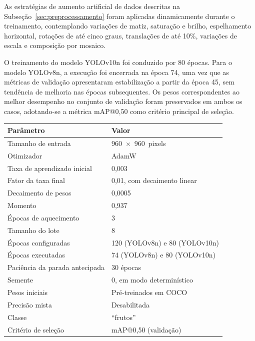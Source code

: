 \documentclass[artigo,times,capa]{iftex2024}
\begin{document}
As estratégias de aumento artificial de dados descritas na
Subseção~\ref{sec:preprocessamento} foram aplicadas dinamicamente
durante o treinamento, contemplando variações de matiz, saturação e
brilho, espelhamento horizontal, rotações de até cinco graus, translações
de até 10\%, variações de escala e composição por mosaico.

O treinamento do modelo YOLOv10n foi conduzido por 80 épocas. Para o
modelo YOLOv8n, a execução foi encerrada na época 74, uma vez que as
métricas de validação apresentaram estabilização a partir da época 45,
sem tendência de melhoria nas épocas subsequentes. Os pesos
correspondentes ao melhor desempenho no conjunto de validação foram
preservados em ambos os casos, adotando-se a métrica mAP@0,50 como
critério principal de seleção.

\begin{board}[htbp]
\centering
\caption{Configuração de treinamento adotada nos experimentos}
\label{quad:config_treinamento}
\begin{tabular}{ll}
\toprule
\textbf{Parâmetro} & \textbf{Valor} \\
\midrule
Tamanho de entrada & 960~$\times$~960~pixels \\
Otimizador & AdamW \\
Taxa de aprendizado inicial & 0,003 \\
Fator da taxa final & 0,01, com decaimento linear \\
Decaimento de pesos & 0,0005 \\
Momento & 0,937 \\
Épocas de aquecimento & 3 \\
Tamanho do lote & 8 \\
Épocas configuradas & 120 (YOLOv8n) e 80 (YOLOv10n) \\
Épocas executadas & 74 (YOLOv8n) e 80 (YOLOv10n) \\
Paciência da parada antecipada & 30 épocas \\
Semente & 0, em modo determinístico \\
Pesos iniciais & Pré-treinados em COCO \\
Precisão mista & Desabilitada \\
Classe & ``frutos'' \\
Critério de seleção & mAP@0,50 (validação) \\
\bottomrule
\end{tabular}
\end{board}
\end{document}
